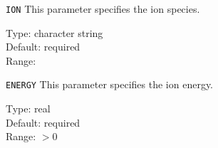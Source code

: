 \begin{keydescription}{\texttt{ION}}
This parameter specifies the ion species. 
\begin{keytab}
   Type:    \> character string \\
   Default: \> required \\
   Range:   \> 
\end{keytab}
\end{keydescription}

\begin{keydescription}{\texttt{ENERGY}}
This parameter specifies the ion energy.
\begin{keytab}
   Type:    \> real \\
   Default: \> required \\
   Range:   \> $ > 0$
\end{keytab}
\end{keydescription}

